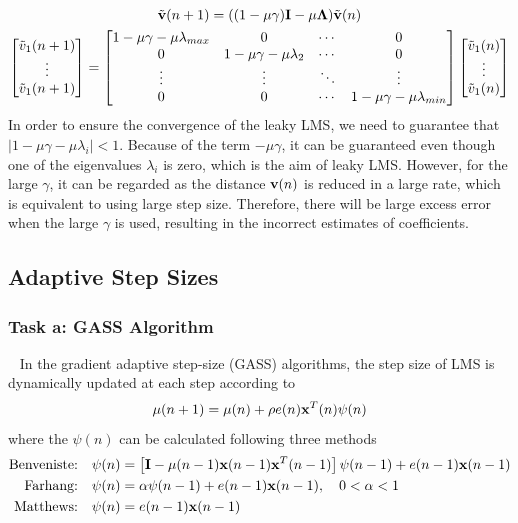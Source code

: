 \documentclass[10pt]{article}
\begin{document}
\begin{itemize}
	\begin{gather}
		\tilde{\bf{v}}(n+1) = ((1-\mu \gamma) {\bf{I}} - \mu {\bf{\Lambda}}) \tilde{\bf{v}}(n) \\
		\left[\begin{matrix}
			\tilde{v}_1(n+1) \\
			\vdots\\
			\tilde{v}_1(n+1)
		\end{matrix}\right] = 
		\left[\begin{matrix}
			1 - \mu \gamma - \mu \lambda_{max} & 0 & \cdots & 0\\
			0 & 1 - \mu \gamma - \mu \lambda_2 & \cdots & 0\\
			\vdots & \vdots & \ddots & \vdots\\
			0 & 0 & \cdots & 1 - \mu \gamma - \mu \lambda_{min}
		\end{matrix}\right] \left[\begin{matrix}
			\tilde{v}_1(n) \\
			\vdots\\
			\tilde{v}_1(n)
		\end{matrix}\right]
	\end{gather}
	In order to ensure the convergence of the leaky LMS, we need to guarantee that 
	$|1 - \mu \gamma - \mu \lambda_i| < 1$. Because of the term $- \mu \gamma$, it can be guaranteed 
	even though one of the eigenvalues $\lambda_i$ is zero, which is the aim of leaky LMS. However, for the 
	large $\gamma$, it can be regarded as the distance ${\bf{v}}(n)$ is reduced in a large rate,
	which is equivalent to using large step size. Therefore, there will be large excess error when the large $\gamma$ is used,
	resulting in the incorrect estimates of coefficients.

\end{itemize}

\subsection{Adaptive Step Sizes}
\subsubsection{Task a: GASS Algorithm}
\ \indent
In the gradient adaptive step-size (GASS) algorithms, the step size of LMS is 
dynamically updated at each step according to
\begin{equation}
	\mu(n+1) = \mu(n) + \rho e(n) {\bf{x}}^T(n) \psi (n)
\end{equation}
where the $\psi(n)$ can be calculated following three methods
\begin{align}
	{\text{Benveniste:}} \quad & \psi(n) = \left[{\bf{I}} - \mu(n-1) {\bf{x}}(n-1) {\bf{x}}^T(n-1) \right] \psi(n-1) + e(n-1) {\bf{x}}(n-1) \\
	{\text{Farhang:}} \quad & \psi(n) = \alpha \psi(n-1) + e(n-1) {\bf{x}}(n-1), \quad 0 < \alpha < 1\\
	{\text{Matthews:}} \quad & \psi(n) = e(n-1) {\bf{x}}(n-1)
\end{align}
\end{document}
